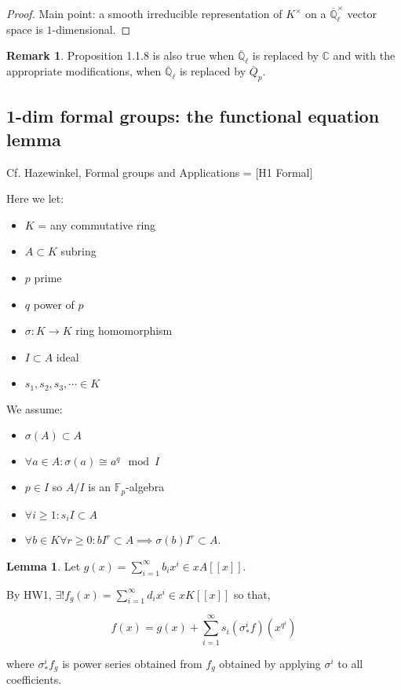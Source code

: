\documentclass{article}
\theoremstyle{definition}
\numberwithin{theorem}{subsection}
\newtheorem{lemma}[theorem]{Lemma}
\newtheorem*{remark}{Remark}
\begin{document}
    \begin{proof}
        Main point: a smooth irreducible representation of \(K^\times\) on a \(\overline{\mathbb{Q}}_{\ell}^\times\) vector space is \(1\)-dimensional.
    \end{proof}

    \begin{remark}
        Proposition 1.1.8 is also true when \(\overline{\mathbb{Q}}_{\ell}\) is replaced by \(\mathbb{C}\) and with the appropriate modifications, when \(\overline{\mathbb{Q}}_{\ell}\) is replaced by \(\overline{Q}_p\).
    \end{remark}

    \subsection{1-dim formal groups: the functional equation lemma}

    Cf. Hazewinkel, Formal groups and Applications = [H1 Formal]

    Here we let:

    \begin{itemize}
        \item \(K\) = any commutative ring
        \item \(A \subset K\) subring
        \item \(p\) prime
        \item \(q\) power of \(p\)
        \item \(\sigma: K \to K\) ring homomorphism
        \item \(I \subset A\) ideal
        \item \(s_1, s_2, s_3, \cdots \in K\) 
    \end{itemize} 

    We assume:

    \begin{itemize}
        \item \(\sigma (A) \subset A\)
        \item \(\forall a\in A: \sigma (a) \cong a^q \mod I\) 
        \item \(p\in I\) so \(A / I\) is an \(\mathbb{F}_p\)-algebra
        \item \(\forall i \geq 1: s_i I \subset A\) 
        \item \(\forall b\in K \forall r \geq 0: b I^r \subset A \implies \sigma (b) I^r \subset A\). 
    \end{itemize} 

    \begin{lemma}

        Let \(g(x) = \sum_{i=1}^{\infty} b_i x^i \in x A[[x]]\).

        By HW1, \(\exists! f_g(x) = \sum_{i=1}^{\infty} d_i x^i \in x K[[x]]\) so that,

        \[
            f(x) = g(x) + \sum_{i=1}^{\infty} s_i (\sigma_{\ast} ^ i f)(x^{q^i}) \tag*{(1.2.1)}
        \]

        where \(\sigma_{\ast}^i f_g\) is power series obtained from \(f_g\) obtained by applying \(\sigma^i\) to all coefficients.
    \end{lemma}
\end{document}
